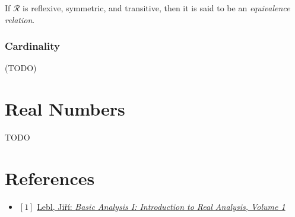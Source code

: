 \documentclass[12pt, letterpaper, oneside]{book}
\begin{document}
If $\mathcal{R}$ is reflexive, symmetric, and transitive, then it is said to be
an \textit{equivalence relation}.

\subsection{Cardinality}

(TODO)

%
%

\chapter{Real Numbers}

TODO

\chapter*{References}

\begin{itemize}
  \item $[1]$ \href{https://ocw.mit.edu/courses/18-100a-real-analysis-fall-2020/resources/mit18_100af20_basic_analysis/}{Lebl, Jiří: \it{Basic Analysis I: Introduction to Real Analysis, Volume 1}}
\end{itemize}
\end{document}

